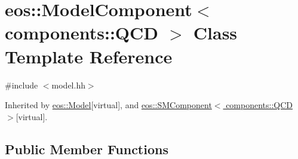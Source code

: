 \hypertarget{classeos_1_1ModelComponent_3_01components_1_1QCD_01_4}{
\section{eos::ModelComponent$<$ components::QCD $>$ Class Template Reference}
\label{classeos_1_1ModelComponent_3_01components_1_1QCD_01_4}
}


{\ttfamily \#include $<$model.hh$>$}

Inherited by \hyperlink{classeos_1_1Model}{eos::Model}{\ttfamily  \mbox{[}virtual\mbox{]}}, and \hyperlink{classeos_1_1SMComponent_3_01components_1_1QCD_01_4}{eos::SMComponent$<$ components::QCD $>$}{\ttfamily  \mbox{[}virtual\mbox{]}}.\subsection*{Public Member Functions}
